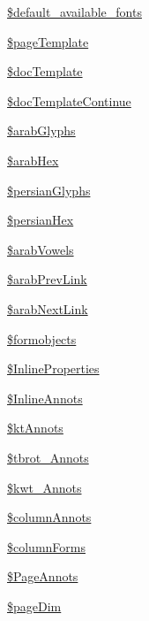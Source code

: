 \begin{DoxyCompactItemize}
\item 
\hyperlink{classm_p_d_f_a68af73bb914639777daf3fd42bd8ab9e}{\$default\-\_\-available\-\_\-fonts}
\item 
\hyperlink{classm_p_d_f_af6882063073624318e467219ffc721f4}{\$page\-Template}
\item 
\hyperlink{classm_p_d_f_a028357454432ce31caf553838a8d8e98}{\$doc\-Template}
\item 
\hyperlink{classm_p_d_f_ae62e93cf8e2f3ff9cda57af17636810f}{\$doc\-Template\-Continue}
\item 
\hyperlink{classm_p_d_f_aeb4bd111ea947afe75b64c1543d092f5}{\$arab\-Glyphs}
\item 
\hyperlink{classm_p_d_f_aebd16cc247d9cd0a4743e56cb2e5fcde}{\$arab\-Hex}
\item 
\hyperlink{classm_p_d_f_adac8cb7653c5bb746190d6f78427ad09}{\$persian\-Glyphs}
\item 
\hyperlink{classm_p_d_f_a437a1250db33367c60eedfed9609348b}{\$persian\-Hex}
\item 
\hyperlink{classm_p_d_f_a12dc26d246bbdcd747bbb72f8938e202}{\$arab\-Vowels}
\item 
\hyperlink{classm_p_d_f_aae5614153aadbd40b283208c43b4ddea}{\$arab\-Prev\-Link}
\item 
\hyperlink{classm_p_d_f_a5663b62d8f3e6b411a1bd66347271bc4}{\$arab\-Next\-Link}
\item 
\hyperlink{classm_p_d_f_ad1d7801e8914624de778293a89756823}{\$formobjects}
\item 
\hyperlink{classm_p_d_f_abf8ac99b19e35b0f546a7935f67e8116}{\$\-Inline\-Properties}
\item 
\hyperlink{classm_p_d_f_a62e0050547e82607ae6e42b77ddfb385}{\$\-Inline\-Annots}
\item 
\hyperlink{classm_p_d_f_ad1e94c2e650e8e3a2fb00735377fc9fb}{\$kt\-Annots}
\item 
\hyperlink{classm_p_d_f_a4dd0731ad660a45aa97230d646c6e68c}{\$tbrot\-\_\-\-Annots}
\item 
\hyperlink{classm_p_d_f_a11f3e50684e605438a5d8e13cbc034b7}{\$kwt\-\_\-\-Annots}
\item 
\hyperlink{classm_p_d_f_a143a18b818e279488b3b7cdbaf49676d}{\$column\-Annots}
\item 
\hyperlink{classm_p_d_f_aa0a0294e47446dfba61316411010f81f}{\$column\-Forms}
\item 
\hyperlink{classm_p_d_f_ab1bcd26f48a33def54ecffb22cc2892e}{\$\-Page\-Annots}
\item 
\hyperlink{classm_p_d_f_add72cfc958a07b95d38cc6012f7d6dc6}{\$page\-Dim}

\end{DoxyCompactItemize}

